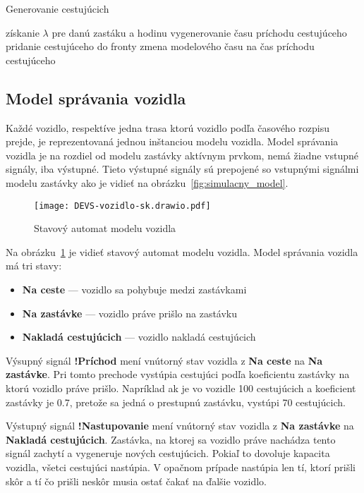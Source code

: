 \vspace*{\dimexpr0.5\baselineskip\relax}
\begin{algorithm}[H]\label{algoritmus_generovanie_cestujucich}
\caption{Generovanie cestujúcich}
  získanie $\lambda$ pre danú zastáku a hodinu\;
   {
    vygenerovanie času príchodu cestujúceho\;
    pridanie cestujúceho do fronty\;
    zmena modelového času na čas príchodu cestujúceho\;
  }
\end{algorithm}

\subsection*{Model správania vozidla}\label{model_vozidla}

Každé vozidlo, respektíve jedna trasa ktorú vozidlo podľa časového rozpisu prejde, je reprezentovaná jednou inštanciou modelu vozidla.
Model správania vozidla je na rozdiel od modelu zastávky aktívnym prvkom, nemá žiadne vstupné signály, iba výstupné.
Tieto výstupné signály sú prepojené so vstupnými signálmi modelu zastávky ako je vidieť na obrázku~\ref{fig:simulacny_model}.

\begin{figure}[h]\label{fig:model_vozidla}
  \centering
  \texttt{[image: DEVS-vozidlo-sk.drawio.pdf]}
  \caption{Stavový automat modelu vozidla}
\end{figure}

Na obrázku~\ref{fig:model_vozidla} je vidieť stavový automat modelu vozidla.
Model správania vozidla má tri stavy:
\begin{itemize}
  \item \textbf{Na ceste} --- vozidlo sa pohybuje medzi zastávkami
  \item \textbf{Na zastávke} --- vozidlo práve prišlo na zastávku
  \item \textbf{Nakladá cestujúcich} --- vozidlo nakladá cestujúcich
\end{itemize}

Výsupný signál \textbf{!Príchod} mení vnútorný stav vozidla z \textbf{Na ceste} na \textbf{Na zastávke}.
Pri tomto prechode vystúpia cestujúci podľa koeficientu zastávky na ktorú vozidlo práve prišlo.
Napríklad ak je vo vozidle 100 cestujúcich a koeficient zastávky je 0.7, pretože sa jedná o prestupnú zastávku, vystúpi 70 cestujúcich.

Výstupný signál \textbf{!Nastupovanie} mení vnútorný stav vozidla z \textbf{Na zastávke} na \textbf{Nakladá cestujúcich}.
Zastávka, na ktorej sa vozidlo práve nachádza tento signál zachytí a vygeneruje nových cestujúcich.
Pokiaľ to dovoluje kapacita vozidla, všetci cestujúci nastúpia.
V opačnom prípade nastúpia len tí, ktorí prišli skôr a tí čo prišli neskôr musia ostať čakať na ďalšie vozidlo.

